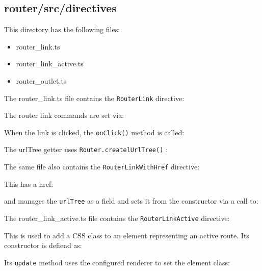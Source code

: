 \subsection{router/src/directives}

This directory has the following files:

\begin{itemize}
  \item router\_link.ts
  \item router\_link\_active.ts
  \item router\_outlet.ts
\end{itemize}

The router\_link.ts file contains the
\texttt{RouterLink}
directive:



The router link commands are set via:



When the link is clicked, the
\texttt{onClick()}
method is called:



The urlTree getter uses
\texttt{Router.createlUrlTree()}
:



The same file also contains the
\texttt{RouterLinkWithHref}
directive:



This has a href:



and manages the
\texttt{urlTree}
as a field and sets it from the constructor via a call to:



The router\_link\_active.ts file contains the
\texttt{RouterLinkActive}
directive:



This is used to add a CSS class to an element representing an active route. Its
constructor is defiend as:



Its
\texttt{update}
method uses the configured renderer to set the element class:



